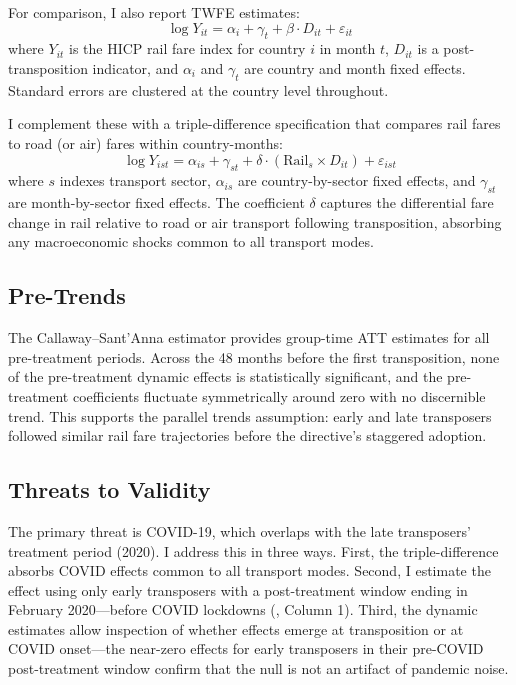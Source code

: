\documentclass[12pt]{article}
\begin{document}
For comparison, I also report TWFE estimates:
\begin{equation}
\log Y_{it} = \alpha_i + \gamma_t + \beta \cdot D_{it} + \varepsilon_{it}
\end{equation}
where $Y_{it}$ is the HICP rail fare index for country $i$ in month $t$, $D_{it}$ is a post-transposition indicator, and $\alpha_i$ and $\gamma_t$ are country and month fixed effects. Standard errors are clustered at the country level throughout.

I complement these with a triple-difference specification that compares rail fares to road (or air) fares within country-months:
\begin{equation}
\log Y_{ist} = \alpha_{is} + \gamma_{st} + \delta \cdot (\text{Rail}_s \times D_{it}) + \varepsilon_{ist}
\end{equation}
where $s$ indexes transport sector, $\alpha_{is}$ are country-by-sector fixed effects, and $\gamma_{st}$ are month-by-sector fixed effects. The coefficient $\delta$ captures the differential fare change in rail relative to road or air transport following transposition, absorbing any macroeconomic shocks common to all transport modes.

\subsection{Pre-Trends}

The Callaway--Sant'Anna estimator provides group-time ATT estimates for all pre-treatment periods. Across the 48 months before the first transposition, none of the pre-treatment dynamic effects is statistically significant, and the pre-treatment coefficients fluctuate symmetrically around zero with no discernible trend. This supports the parallel trends assumption: early and late transposers followed similar rail fare trajectories before the directive's staggered adoption.

\subsection{Threats to Validity}

The primary threat is COVID-19, which overlaps with the late transposers' treatment period (2020). I address this in three ways. First, the triple-difference absorbs COVID effects common to all transport modes. Second, I estimate the effect using only early transposers with a post-treatment window ending in February 2020---before COVID lockdowns (, Column 1). Third, the dynamic estimates allow inspection of whether effects emerge at transposition or at COVID onset---the near-zero effects for early transposers in their pre-COVID post-treatment window confirm that the null is not an artifact of pandemic noise.
\end{document}
